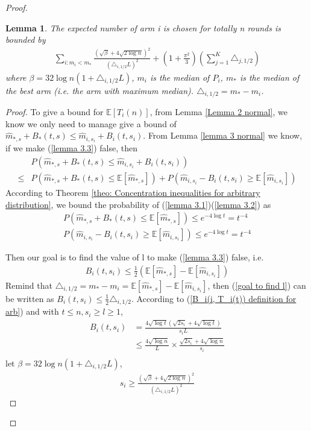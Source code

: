 \documentclass{article}
\theoremstyle{plain}
\newtheorem{lemma}{Lemma}
\begin{document}
\begin{proof}
\begin{lemma}
\label{Lemma 4: bound for E[T_i(n)]}
    The expected number of arm i is chosen for totally n rounds is bounded by 
    \begin{align}
    \sum_{i: m_i < m_\ast} \frac{(\sqrt{\beta} + 4\sqrt{2\log n})^2}{ (\triangle_{i, 1/2} L)^2} + (1 + \frac{\pi^2}{3}) (\sum_{j=1}^K \triangle_{j, 1/2}) 
\end{align}
where $\beta = 32 \log n (1 + \triangle_{i, 1/2} L)$, $m_i$ is the median of $P_i$, $m_\ast$ is the median of the best arm (i.e. the arm with maximum median). $\triangle_{i, 1/2} = m_\ast - m_i$. 
\end{lemma}

\begin{proof}
To give a bound for $\mathbb{E}[T_i(n)]$, from Lemma \ref{Lemma 2 normal}, we know we only need to manage give a bound of $\hat{m}_{*, s} + B_*(t, s)  \leq \hat{m}_{i, s_i} + B_i(t, s_i)$. From Lemma \ref{lemma 3 normal} we know, if we make (\ref{lemma 3.3}) false, then 
\begin{align}
    & P(\hat{m}_{*, s} + B_*(t, s)  \leq \hat{m}_{i, s_i} + B_i(t, s_i)) \\
    \leq &  P(\hat{m}_{*, s} + B_*(t, s) \leq  \mathbb{E}[\hat{m}_{*, s}]) + P(\hat{m}_{i, s_i} - B_i(t, s_i) \geq \mathbb{E}[\hat{m}_{i, s_i}])
\end{align}
According to Theorem \ref{theo: Concentration inequalities for arbitrary distribution}, we bound the probability of (\ref{lemma 3.1})(\ref{lemma 3.2}) as
    \begin{align}
        P(\hat{m}_{*, s} + B_*(t, s) \leq  \mathbb{E}[\hat{m}_{*, s}]) \leq  e^{-4\log t} = t^{-4}\\
        P(\hat{m}_{i, s_i} - B_i(t, s_i) \geq \mathbb{E}[\hat{m}_{i, s_i}])  \leq  e^{-4\log t} = t^{-4}
    \end{align}
    
    Then our goal is to find the value of l to make (\ref{lemma 3.3}) false, i.e. 
    \begin{align}
    \label{goal to find l}
        B_i(t, s_i) \leq  \frac{1}{2}(\mathbb{E}[\hat{m}_{*, s}] - \mathbb{E}[\hat{m}_{i, s_i}])
    \end{align}
    Remind that $\triangle_{i, 1/2} = m_* - m_i = \mathbb{E}[\hat{m}_{*, s}] - \mathbb{E}[\hat{m}_{i, s_i}]$, then (\ref{goal to find l}) can be written as $B_i(t, s_i) \leq  \frac{1}{2} \triangle_{i, 1/2}$. According to (\ref{B_i(i, T_i(t)) definition for arb}) and with $t \leq n, s_i \geq l \geq 1$, 
    \begin{align}
        B_i(t, s_i) &= \frac{4 \sqrt{\log t} ( \sqrt{ 2s_i} + 4\sqrt{\log t})}{s_i L}\\
        & \leq \frac{4 \sqrt{\log n}}{ L} \times \frac{\sqrt{2s_i} + 4\sqrt{\log n}}{s_i}\\
    \end{align}
    let $\beta = 32 \log n (1 + \triangle_{i, 1/2} L)$,
    \begin{align}
        s_i \geq \frac{(\sqrt{\beta} + 4\sqrt{2\log n})^2}{ (\triangle_{i, 1/2} L)^2}
    \end{align}
    

\end{proof}
\end{proof}
\end{document}
